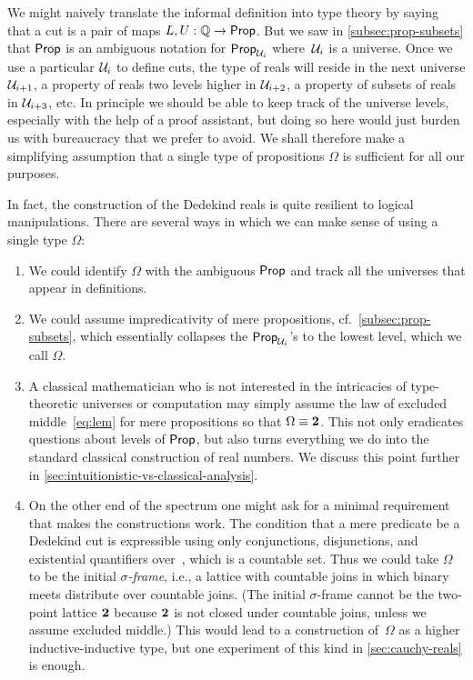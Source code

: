 %
We might naively translate the informal definition into type theory by saying that a cut
is a pair of maps $L, U : \mathbb{Q} \to \mathsf{Prop}$. But we saw in \autoref{subsec:prop-subsets} that
$\mathsf{Prop}$ is an ambiguous notation for $\mathsf{Prop}_{\mathcal{U}_i}$ where~$\mathcal{U}_i$ is a universe. Once we
use a particular $\mathcal{U}_i$ to define cuts, the type of reals will reside in the next
universe $\mathcal{U}_{i+1}$, a property of reals two levels higher in $\mathcal{U}_{i+2}$, a property of
subsets of reals in $\mathcal{U}_{i+3}$, etc. In principle we should be able to keep track of the
universe levels, especially with the help of a proof assistant, but doing so here would
just burden us with bureaucracy that we prefer to avoid. We shall therefore make a
simplifying assumption that a single type of propositions $\Omega$ is sufficient for all
our purposes.

In fact, the construction of the Dedekind reals is quite resilient to logical
manipulations. There are several ways in which we can make sense of using a single type
$\Omega$:
%
\begin{enumerate}

\item We could identify $\Omega$ with the ambiguous $\mathsf{Prop}$ and track all the universes
  that appear in definitions.

\item We could assume impredicativity of mere propositions, cf.\
  \ref{subsec:prop-subsets}, which essentially collapses the $\mathsf{Prop}_{\mathcal{U}_i}$'s to the
  lowest level, which we call $\Omega$.

\item A classical mathematician who is not interested in the intricacies of type-theoretic
  universes or computation may simply assume the law of excluded middle~\eqref{eq:lem} for
  mere propositions so that $\Omega \equiv \mathbf{2}$. This not only eradicates questions about
  levels of $\mathsf{Prop}$, but also turns everything we do into the standard classical
  construction of real numbers. We discuss this point further in
  \autoref{sec:intuitionistic-vs-classical-analysis}.

\item On the other end of the spectrum one might ask for a minimal requirement that makes
  the constructions work. The condition that a mere predicate be a Dedekind cut is
  expressible using only conjunctions, disjunctions, and existential quantifiers over~\Q, which
  is a countable set. Thus we could take $\Omega$ to be the initial \emph{$\sigma$-frame},
  i.e., a lattice with countable joins in which binary meets distribute over countable
  joins. (The initial $\sigma$-frame cannot be the two-point lattice $\mathbf{2}$ because
  $\mathbf{2}$ is not closed under countable joins, unless we assume excluded middle.) This
  would lead to a construction of~$\Omega$ as a higher inductive-inductive type, but one
  experiment of this kind in \autoref{sec:cauchy-reals} is enough.
\end{enumerate}


